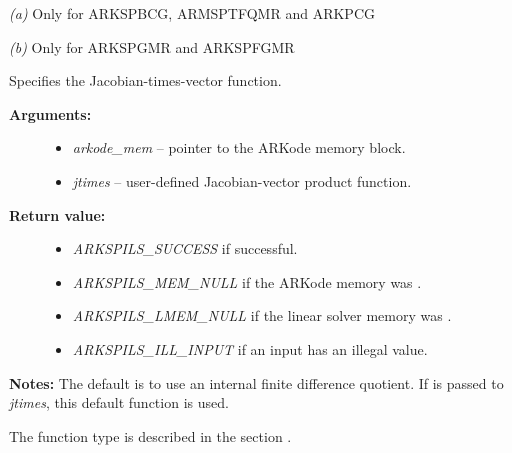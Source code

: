 \documentclass[letterpaper,10pt,english]{sphinxmanual}
\begin{document}
\emph{(a)} Only for ARKSPBCG, ARMSPTFQMR and ARKPCG

\emph{(b)} Only for ARKSPGMR and ARKSPFGMR

\begin{fulllineitems}
\label{c_interface/User_callable:c.ARKSpilsSetJacTimesVecFn}
Specifies the Jacobian-times-vector function.
\begin{description}
\item[{\textbf{Arguments:}}] \leavevmode\begin{itemize}
\item {} 
\emph{arkode\_mem} -- pointer to the ARKode memory block.

\item {} 
\emph{jtimes} -- user-defined Jacobian-vector product function.

\end{itemize}

\item[{\textbf{Return value:}}] \leavevmode\begin{itemize}
\item {} 
\emph{ARKSPILS\_SUCCESS} if successful.

\item {} 
\emph{ARKSPILS\_MEM\_NULL} if the ARKode memory was .

\item {} 
\emph{ARKSPILS\_LMEM\_NULL} if the linear solver memory was .

\item {} 
\emph{ARKSPILS\_ILL\_INPUT} if an input has an illegal value.

\end{itemize}

\end{description}

\textbf{Notes:} The default is to use an internal finite difference
quotient.  If  is passed to \emph{jtimes}, this default function is used.

The function type {\hyperref[c_interface/User_supplied:c.ARKSpilsJacTimesVecFn]{\emph{}}} is described in the
section {\hyperref[c_interface/User_supplied:cinterface-usersupplied]{\emph{}}}.

\end{fulllineitems}
\end{document}
